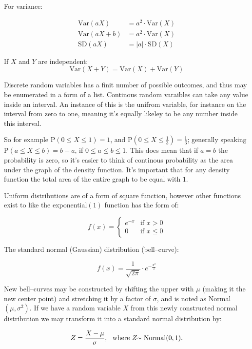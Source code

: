 For variance:



\begin{align*}
	\mbox{Var}(aX)   & = a^2\cdot\mbox{Var}(X) \\
	\mbox{Var}(aX+b) & = a^2\cdot\mbox{Var}(X) \\
	\mbox{SD}(aX)    & = |a|\cdot\mbox{SD}(X)
\end{align*}

If $X$ and $Y$ are independent:
\[ \mbox{Var}(X+Y) = \mbox{Var}(X) + \mbox{Var}(Y)
\]

Discrete random variables has a finit number of possible outcomes, and thus may
be enumerated in a form of a list. Continous random varaibles can take any value
inside an interval. An instance of this is the unifrom variable, for instance on
the interval from zero to one, meaning it's equally likeley to be any number
inside this interval.

So for example P$(0 \leq X \leq 1) = 1$, and P$(0 \leq X \leq \frac{1}{3}) =
	\frac{1}{3}$; generally speaking P$(a \leq X \leq b) = b - a$, if $0 \leq a \leq
	b \leq 1$. This does mean that if $a=b$ the probability is zero, so it's easier
to think of continous probability as the area under the graph of the density
function. It's important that for any density function the total area of the
entire graph to be equal with $1$.

Uniform distributions are of a form of square function, however other functions
exist to like the exponential$(1)$ function has the form of:

\[
	f(x) =
	\begin{cases}
		e^{-x} & \text{if } x > 0    \\
		0      & \text{if } x \leq 0
	\end{cases}
\]

The standard normal (Gaussian) distribution (bell--curve):

\[ f(x)=\frac{1}{\sqrt{2\pi}} \cdot e ^{-\frac{x^2}{2}}\]

New bell--curves may be constructed by shifting the upper with $\mu$ (making it
the new center point) and stretching it by a factor of $\sigma$, and is noted as
Normal$(\mu, \sigma^2)$. If we have a random variable $X$ from this newly
constructed normal distribution we may transform it into a standard normal
distribution by:

\[
	Z = \frac{X - \mu}{\sigma} , \mbox{~ where $Z ${\raise.17ex\hbox{$\scriptstyle\mathtt{\sim}$}} Normal} (0,1).
\]

